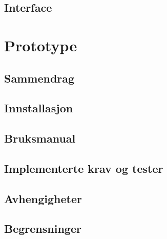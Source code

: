 \documentclass[12pt]{article}
\begin{document}
    \subsection{Interface}

%
%

\section{Prototype}

    \subsection{Sammendrag}

    \subsection{Innstallasjon}

    \subsection{Bruksmanual}

    \subsection{Implementerte krav og tester}

    \subsection{Avhengigheter}

    \subsection{Begrensninger}
\end{document}
